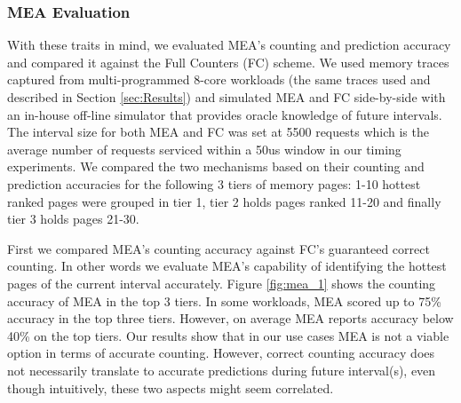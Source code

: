 
\subsubsection*{MEA Evaluation}

With these traits in mind, we evaluated MEA's counting and prediction accuracy and compared it against the Full Counters (FC) scheme. We used memory traces captured from multi-programmed 8-core workloads (the same traces used and described in Section \ref{sec:Results}) and simulated MEA and FC side-by-side with an in-house off-line simulator that provides oracle knowledge of future intervals. The interval size for both MEA and FC was set at 5500 requests which is the average number of requests serviced within a 50us window in our timing experiments. We compared the two mechanisms based on their counting and prediction accuracies for the following 3 tiers of memory pages: 1-10 hottest ranked pages were grouped in tier 1, tier 2 holds pages ranked 11-20 and finally tier 3 holds pages 21-30. 

First we compared MEA's counting accuracy against FC's guaranteed correct counting. In other words we evaluate MEA's capability of identifying the hottest pages of the current interval accurately. Figure \ref{fig:mea_1} shows the counting accuracy of MEA in the top 3 tiers. In some workloads, MEA scored up to 75\% accuracy in the top three tiers. However, on average MEA reports accuracy below 40\% on the top tiers. Our results show that in our use cases MEA is not a viable option in terms of accurate counting. However, correct counting accuracy does not necessarily translate to accurate predictions during future interval(s), even though intuitively, these two aspects might seem correlated.

